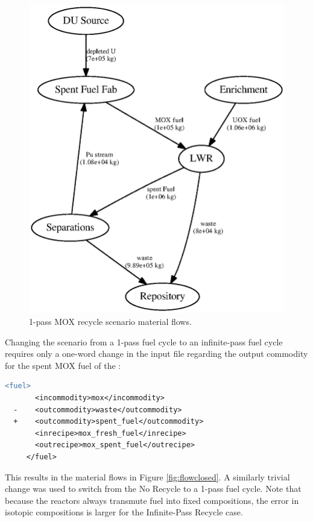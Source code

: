 \begin{figure}[H]
\begin{center}
\includegraphics{./images/flow-mod-open-1.eps}
\end{center}
\caption{1-pass \gls{MOX} recycle scenario material flows.}
\label{fig:flowmodopen}
\end{figure}

Changing the scenario from a 1-pass fuel cycle to an infinite-pass fuel cycle
requires only a one-word change in the input file regarding the output
commodity for the spent \gls{MOX} fuel of the :

\begin{lstlisting}[language=diff]
     <fuel>
       <incommodity>mox</incommodity>
  -    <outcommodity>waste</outcommodity>
  +    <outcommodity>spent_fuel</outcommodity>
       <inrecipe>mox_fresh_fuel</inrecipe>
       <outrecipe>mox_spent_fuel</outrecipe>
     </fuel>
\end{lstlisting}

This results in the material flows in Figure \ref{fig:flowclosed}.  A
similarly trivial change was used to switch from the No Recycle to a 1-pass
fuel cycle.  Note that because the reactors always transmute fuel into fixed
compositions, the error in isotopic compositions is larger for the
Infinite-Pass Recycle case.

